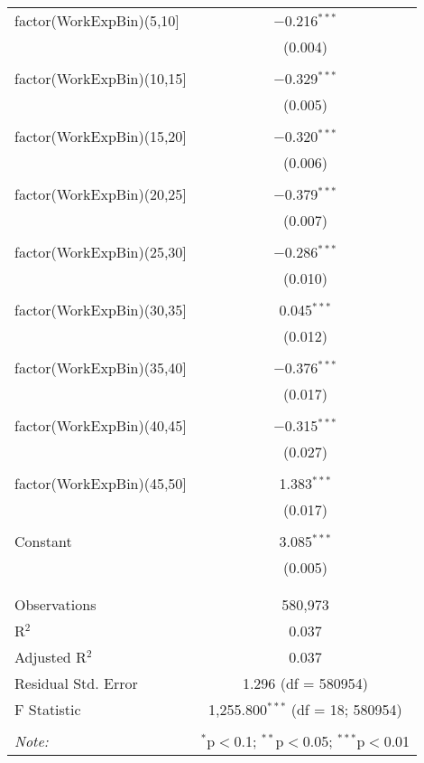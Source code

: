 \begin{table}[!htbp]
\begin{tabular}{@{\extracolsep{5pt}}lc}
 factor(WorkExpBin)(5,10] & $-$0.216$^{***}$ \\ 
  & (0.004) \\ 
  & \\ 
 factor(WorkExpBin)(10,15] & $-$0.329$^{***}$ \\ 
  & (0.005) \\ 
  & \\ 
 factor(WorkExpBin)(15,20] & $-$0.320$^{***}$ \\ 
  & (0.006) \\ 
  & \\ 
 factor(WorkExpBin)(20,25] & $-$0.379$^{***}$ \\ 
  & (0.007) \\ 
  & \\ 
 factor(WorkExpBin)(25,30] & $-$0.286$^{***}$ \\ 
  & (0.010) \\ 
  & \\ 
 factor(WorkExpBin)(30,35] & 0.045$^{***}$ \\ 
  & (0.012) \\ 
  & \\ 
 factor(WorkExpBin)(35,40] & $-$0.376$^{***}$ \\ 
  & (0.017) \\ 
  & \\ 
 factor(WorkExpBin)(40,45] & $-$0.315$^{***}$ \\ 
  & (0.027) \\ 
  & \\ 
 factor(WorkExpBin)(45,50] & 1.383$^{***}$ \\ 
  & (0.017) \\ 
  & \\ 
 Constant & 3.085$^{***}$ \\ 
  & (0.005) \\ 
  & \\ 
\hline \\[-1.8ex] 
Observations & 580,973 \\ 
R$^{2}$ & 0.037 \\ 
Adjusted R$^{2}$ & 0.037 \\ 
Residual Std. Error & 1.296 (df = 580954) \\ 
F Statistic & 1,255.800$^{***}$ (df = 18; 580954) \\ 
\hline 
\hline \\[-1.8ex] 
\textit{Note:}  & \multicolumn{1}{r}{$^{*}$p$<$0.1; $^{**}$p$<$0.05; $^{***}$p$<$0.01} \\ 
\end{tabular} 
\end{table} 
